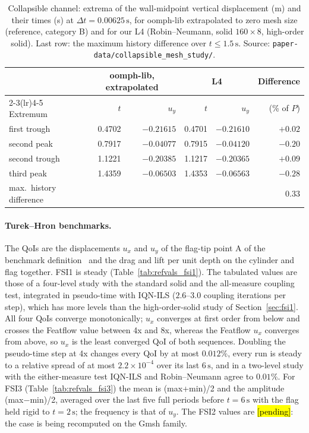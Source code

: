 \begin{table}[htbp]
	\centering
	\small
	\caption{Collapsible channel: extrema of the wall-midpoint vertical displacement (m) and their times (s) at $\Delta t = 0.00625\,\mathrm{s}$, for oomph-lib extrapolated to zero mesh size (reference, category B) and for our L4 (Robin--Neumann, solid $160\times8$, high-order solid). Last row: the maximum history difference over $t \leq 1.5\,\mathrm{s}$. Source: \texttt{paper-data/collapsible\_mesh\_study/}.}
	\label{tab:refvals_collapsible}
	\setlength{\tabcolsep}{4pt}
	\begin{tabular}{lrrrrr}
		\toprule
		 & \multicolumn{2}{c}{oomph-lib, extrapolated} & \multicolumn{2}{c}{L4} & Difference \\
		\cmidrule(lr){2-3}\cmidrule(lr){4-5}
		Extremum & $t$ & $u_y$ & $t$ & $u_y$ & (\% of $P$) \\
		\midrule
		first trough & 0.4702 & $-0.21615$ & 0.4701 & $-0.21610$ & $+0.02$ \\
		second peak & 0.7917 & $-0.04077$ & 0.7915 & $-0.04120$ & $-0.20$ \\
		second trough & 1.1221 & $-0.20385$ & 1.1217 & $-0.20365$ & $+0.09$ \\
		third peak & 1.4359 & $-0.06503$ & 1.4353 & $-0.06563$ & $-0.28$ \\
		\midrule
		max.\ history difference & & & & & $0.33$ \\
		\bottomrule
	\end{tabular}
\end{table}

\paragraph{Turek--Hron benchmarks.}
The QoIs are the displacements $u_x$ and $u_y$ of the flag-tip point A of the benchmark definition~\citep{Turek2006} and the drag and lift per unit depth on the cylinder and flag together.
FSI1 is steady (Table~\ref{tab:refvals_fsi1}). The tabulated values are those of a four-level study with the standard solid and the all-measure coupling test, integrated in pseudo-time with IQN-ILS ($2.6$--$3.0$ coupling iterations per step), which has more levels than the high-order-solid study of Section~\ref{sec:fsi1}.
All four QoIs converge monotonically; $u_x$ converges at first order from below and crosses the Featflow value between 4x and 8x, whereas the Featflow $u_x$ converges from above, so $u_x$ is the least converged QoI of both sequences.
Doubling the pseudo-time step at 4x changes every QoI by at most $0.012\%$, every run is steady to a relative spread of at most $2.2\times10^{-4}$ over its last $6\,\mathrm{s}$, and in a two-level study with the either-measure test IQN-ILS and Robin--Neumann agree to $0.01\%$.
For FSI3 (Table~\ref{tab:refvals_fsi3}) the mean is (max+min)/2 and the amplitude (max$-$min)/2, averaged over the last five full periods before $t = 6\,\mathrm{s}$ with the flag held rigid to $t = 2\,\mathrm{s}$; the frequency is that of $u_y$.
The FSI2 values are \hl{[pending]}: the case is being recomputed on the Gmsh family.

